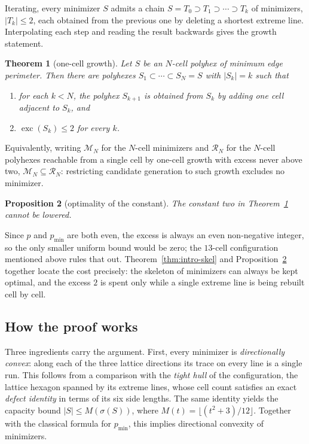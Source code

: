 \documentclass[11pt]{article}
\theoremstyle{plain}
\newtheorem{theorem}{Theorem}[section]
\newtheorem{proposition}[theorem]{Proposition}
\theoremstyle{definition}
\theoremstyle{remark}
\DeclareMathOperator{\exc}{exc}
\begin{document}
Iterating, every minimizer \(S\) admits a chain
\(S=T_{0}\supset T_{1}\supset\cdots\supset T_{k}\) of minimizers, \(|T_{k}|\le2\), each
obtained from the previous one by deleting a shortest extreme line. Interpolating each
step and reading the result backwards gives the growth statement.

\begin{theorem}[one-cell growth]\label{thm:intro-main}
Let \(S\) be an \(N\)-cell polyhex of minimum edge perimeter. Then there are polyhexes
\(S_{1}\subset\cdots\subset S_{N}=S\) with \(|S_{k}|=k\) such that
\begin{enumerate}
\item[(a)] for each \(k<N\), the polyhex \(S_{k+1}\) is obtained from \(S_{k}\) by adding one
cell adjacent to \(S_{k}\), and
\item[(b)] \(\exc(S_{k})\le2\) for every \(k\).
\end{enumerate}
\end{theorem}

Equivalently, writing \(\mathcal{M}_{N}\) for the \(N\)-cell minimizers and
\(\mathcal{R}_{N}\) for the \(N\)-cell polyhexes reachable from a single cell by one-cell
growth with excess never above two, \(\mathcal{M}_{N}\subseteq\mathcal{R}_{N}\): restricting
candidate generation to such growth excludes no minimizer.

\begin{proposition}[optimality of the constant]\label{thm:intro-sharp}
The constant two in Theorem~\ref{thm:intro-main} cannot be lowered.
\end{proposition}

Since \(p\) and \(p_{\min}\) are both even, the excess is always an even non-negative
integer, so the only smaller uniform bound would be zero; the \(13\)-cell configuration
mentioned above rules that out. Theorem~\ref{thm:intro-skel} and Proposition~\ref{thm:intro-sharp}
together locate the cost precisely: the skeleton of minimizers can always be kept optimal,
and the excess \(2\) is spent only while a single extreme line is being rebuilt cell by cell.

\subsection{How the proof works}\label{sec:0.3}

Three ingredients carry the argument. First, every minimizer is \emph{directionally
convex}: along each of the three lattice directions its trace on every line is a single
run. This follows from a comparison with the \emph{tight hull} of the configuration, the
lattice hexagon spanned by its extreme lines, whose cell count satisfies an exact
\emph{defect identity} in terms of its six side lengths. The same identity yields the capacity bound
\(|S|\le M(\sigma(S))\), where \(M(t)=\lfloor(t^{2}+3)/12\rfloor\). Together
with the classical formula for \(p_{\min}\), this implies directional convexity
of minimizers.
\end{document}
